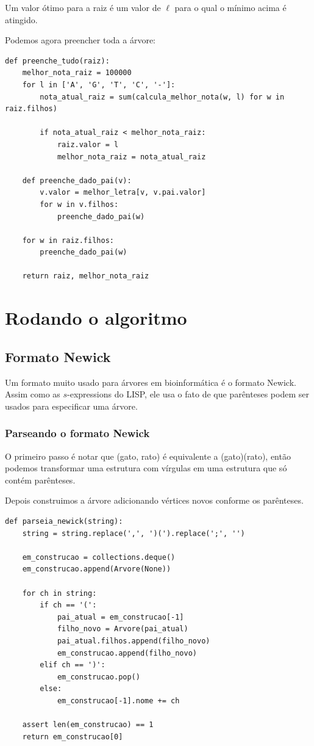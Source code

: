 \documentclass[11pt]{article}
\begin{document}
Um valor ótimo para a raiz é um valor de $\ell$ para o qual o mínimo
acima é atingido.


Podemos agora preencher toda a árvore:
\begin{verbatim}
def preenche_tudo(raiz):
    melhor_nota_raiz = 100000
    for l in ['A', 'G', 'T', 'C', '-']:
        nota_atual_raiz = sum(calcula_melhor_nota(w, l) for w in raiz.filhos)

        if nota_atual_raiz < melhor_nota_raiz:
            raiz.valor = l
            melhor_nota_raiz = nota_atual_raiz

    def preenche_dado_pai(v):
        v.valor = melhor_letra[v, v.pai.valor]
        for w in v.filhos:
            preenche_dado_pai(w)

    for w in raiz.filhos:
        preenche_dado_pai(w)

    return raiz, melhor_nota_raiz
\end{verbatim}

\section{Rodando o algoritmo}
\label{sec-3}

\subsection{Formato Newick}
\label{sec-3-1}

Um formato muito usado para árvores em bioinformática é o formato
Newick. Assim como as $s$-expressions do LISP, ele usa o fato de que
parênteses podem ser usados para especificar uma árvore.

\subsubsection{Parseando o formato Newick}
\label{sec-3-1-1}

O primeiro passo é notar que (gato, rato) é equivalente a
(gato)(rato), então podemos transformar uma estrutura com vírgulas
em uma estrutura que só contém parênteses.

Depois construimos a árvore adicionando vértices novos conforme os
parênteses.
\begin{verbatim}
def parseia_newick(string):
    string = string.replace(',', ')(').replace(';', '')

    em_construcao = collections.deque()
    em_construcao.append(Arvore(None))

    for ch in string:
        if ch == '(':
            pai_atual = em_construcao[-1]
            filho_novo = Arvore(pai_atual)
            pai_atual.filhos.append(filho_novo)
            em_construcao.append(filho_novo)
        elif ch == ')':
            em_construcao.pop()
        else:
            em_construcao[-1].nome += ch

    assert len(em_construcao) == 1
    return em_construcao[0]
\end{verbatim}
\end{document}
